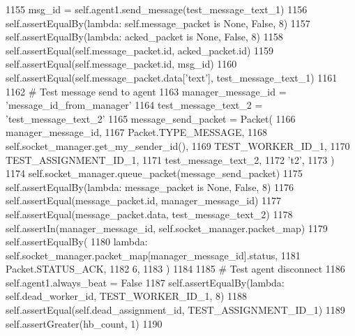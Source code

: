 \begin{DoxyCode}
1155         msg\_id = self.agent1.send\_message(test\_message\_text\_1)
1156         self.assertEqualBy(\textcolor{keyword}{lambda}: self.message\_packet \textcolor{keywordflow}{is} \textcolor{keywordtype}{None}, \textcolor{keyword}{False}, 8)
1157         self.assertEqualBy(\textcolor{keyword}{lambda}: acked\_packet \textcolor{keywordflow}{is} \textcolor{keywordtype}{None}, \textcolor{keyword}{False}, 8)
1158         self.assertEqual(self.message\_packet.id, acked\_packet.id)
1159         self.assertEqual(self.message\_packet.id, msg\_id)
1160         self.assertEqual(self.message\_packet.data[\textcolor{stringliteral}{'text'}], test\_message\_text\_1)
1161 
1162         \textcolor{comment}{# Test message send to agent}
1163         manager\_message\_id = \textcolor{stringliteral}{'message\_id\_from\_manager'}
1164         test\_message\_text\_2 = \textcolor{stringliteral}{'test\_message\_text\_2'}
1165         message\_send\_packet = Packet(
1166             manager\_message\_id,
1167             Packet.TYPE\_MESSAGE,
1168             self.socket\_manager.get\_my\_sender\_id(),
1169             TEST\_WORKER\_ID\_1,
1170             TEST\_ASSIGNMENT\_ID\_1,
1171             test\_message\_text\_2,
1172             \textcolor{stringliteral}{'t2'},
1173         )
1174         self.socket\_manager.queue\_packet(message\_send\_packet)
1175         self.assertEqualBy(\textcolor{keyword}{lambda}: message\_packet \textcolor{keywordflow}{is} \textcolor{keywordtype}{None}, \textcolor{keyword}{False}, 8)
1176         self.assertEqual(message\_packet.id, manager\_message\_id)
1177         self.assertEqual(message\_packet.data, test\_message\_text\_2)
1178         self.assertIn(manager\_message\_id, self.socket\_manager.packet\_map)
1179         self.assertEqualBy(
1180             \textcolor{keyword}{lambda}: self.socket\_manager.packet\_map[manager\_message\_id].status,
1181             Packet.STATUS\_ACK,
1182             6,
1183         )
1184 
1185         \textcolor{comment}{# Test agent disconnect}
1186         self.agent1.always\_beat = \textcolor{keyword}{False}
1187         self.assertEqualBy(\textcolor{keyword}{lambda}: self.dead\_worker\_id, TEST\_WORKER\_ID\_1, 8)
1188         self.assertEqual(self.dead\_assignment\_id, TEST\_ASSIGNMENT\_ID\_1)
1189         self.assertGreater(hb\_count, 1)
1190 
\end{DoxyCode}
\mbox{\label{classparlai_1_1mturk_1_1core_1_1test_1_1test__socket__manager_1_1TestSocketManagerMessageHandling_a7d601bf13b32544669ce064e7e6f4cbb}} 
